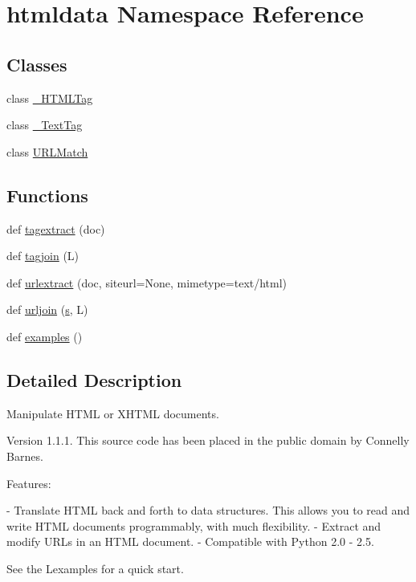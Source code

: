 \hypertarget{namespacehtmldata}{}\section{htmldata Namespace Reference}
\label{namespacehtmldata}
\subsection*{Classes}
\begin{DoxyCompactItemize}
\item 
class \hyperlink{classhtmldata_1_1___h_t_m_l_tag}{\+\_\+\+H\+T\+M\+L\+Tag}
\item 
class \hyperlink{classhtmldata_1_1___text_tag}{\+\_\+\+Text\+Tag}
\item 
class \hyperlink{classhtmldata_1_1_u_r_l_match}{U\+R\+L\+Match}
\end{DoxyCompactItemize}
\subsection*{Functions}
\begin{DoxyCompactItemize}
\item 
def \hyperlink{namespacehtmldata_a3d5a0fd3ca07d74ca1fcd1d825102307}{tagextract} (doc)
\item 
def \hyperlink{namespacehtmldata_abea91d7c71df2f825ea2fd1ab11387cd}{tagjoin} (L)
\item 
def \hyperlink{namespacehtmldata_a849b6b90a5518672e5494c58e7bee65c}{urlextract} (doc, siteurl=None, mimetype=\textquotesingle{}text/html\textquotesingle{})
\item 
def \hyperlink{namespacehtmldata_a281fd13bfba54efd22dfe1e901181648}{urljoin} (\hyperlink{lib_2expat_8h_a755339d27872b13735c2cab829e47157}{s}, L)
\item 
def \hyperlink{namespacehtmldata_ab52faf44a3a2bcdf3bf87668c93cba00}{examples} ()
\end{DoxyCompactItemize}


\subsection{Detailed Description}
\begin{DoxyVerb}Manipulate HTML or XHTML documents.

Version 1.1.1.  This source code has been placed in the
public domain by Connelly Barnes.

Features:

 - Translate HTML back and forth to data structures.
 This allows you to read and write HTML documents
 programmably, with much flexibility.
 - Extract and modify URLs in an HTML document.
 - Compatible with Python 2.0 - 2.5.

See the L{examples} for a quick start.\end{DoxyVerb}
 

